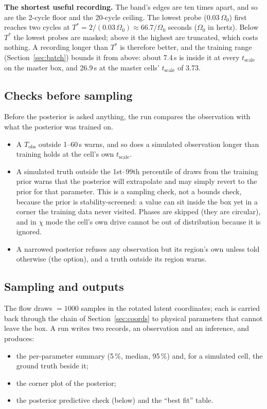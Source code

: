 \documentclass[10pt,a4paper]{article}
\newcommand{\code}[1]{\texttt{\detokenize{#1}}}
\newcommand{\Tobs}{T_{\mathrm{obs}}}
\newcommand{\tscale}{t_{\mathrm{scale}}}
\begin{document}
\textbf{The shortest useful recording.} The band's edges are ten times apart, and so are the 2-cycle floor and the 20-cycle
ceiling. The lowest probe ($0.03\,\Omega_0$) first reaches two cycles at $T^\ast=2/(0.03\,\Omega_0)\approx 66.7/\Omega_0$ seconds
($\Omega_0$ in hertz). Below $T^\ast$ the lowest probes are masked; above it the highest are truncated, which costs
nothing. A recording longer than $T^\ast$ is therefore better, and the training range (Section~\ref{sec:batch}) bounds it
from above: about 7.4\,s is inside it at every $\tscale$ on the master box, and 26.9\,s at the master cells' $\tscale$ of 3.73.

\subsection{Checks before sampling}

Before the posterior is asked anything, the run compares the observation with what the posterior was trained on.
\begin{itemize}[leftmargin=1.4em,itemsep=1pt,topsep=2pt]
  \item A $\Tobs$ outside 1--60\,s warns, and so does a simulated observation longer than training holds at the cell's own
        $\tscale$.
  \item A simulated truth outside the 1st--99th percentile of draws from the training prior warns that the posterior will
        extrapolate and may simply revert to the prior for that parameter. This is a sampling check, not a bounds check,
        because the prior is stability-screened: a value can sit inside the box yet in a corner the training data never
        visited. Phases are skipped (they are circular), and in $\chi$ mode the cell's own drive cannot be out of
        distribution because it is ignored.
  \item A narrowed posterior refuses any observation but its region's own unless told otherwise (the \code{Accept}
        option), and a truth outside its region warns.
\end{itemize}

\subsection{Sampling and outputs}

The flow draws \code{--n-samples} $=1000$ samples in the rotated latent coordinates; each is carried back through the chain
of Section~\ref{sec:coords} to physical parameters that cannot leave the box. A run writes two records, an observation and
an inference, and produces:
\begin{itemize}[leftmargin=1.4em,itemsep=1pt,topsep=2pt]
  \item the per-parameter summary (5\,\%, median, 95\,\%) and, for a simulated cell, the ground truth beside it;
  \item the corner plot of the posterior;
  \item the posterior predictive check (below) and the ``best fit'' table.
\end{itemize}
\end{document}
